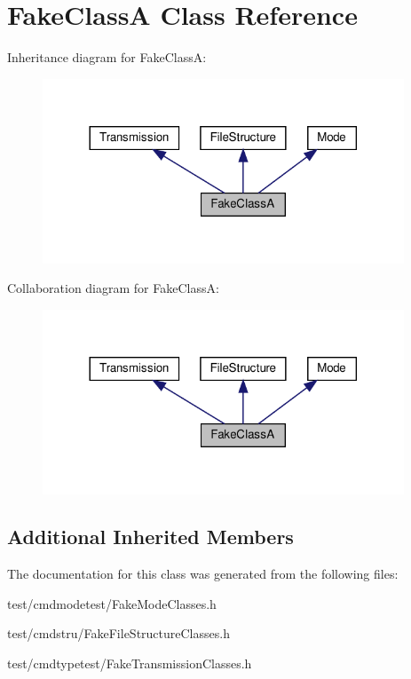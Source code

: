 \hypertarget{classFakeClassA}{}\section{Fake\+ClassA Class Reference}
\label{classFakeClassA}


Inheritance diagram for Fake\+ClassA\+:
\nopagebreak
\begin{figure}[H]
\begin{center}
\leavevmode
\includegraphics[width=305pt]{classFakeClassA__inherit__graph}
\end{center}
\end{figure}


Collaboration diagram for Fake\+ClassA\+:
\nopagebreak
\begin{figure}[H]
\begin{center}
\leavevmode
\includegraphics[width=305pt]{classFakeClassA__coll__graph}
\end{center}
\end{figure}
\subsection*{Additional Inherited Members}


The documentation for this class was generated from the following files\+:\begin{DoxyCompactItemize}
\item 
test/cmdmodetest/Fake\+Mode\+Classes.\+h\item 
test/cmdstru/Fake\+File\+Structure\+Classes.\+h\item 
test/cmdtypetest/Fake\+Transmission\+Classes.\+h\end{DoxyCompactItemize}
